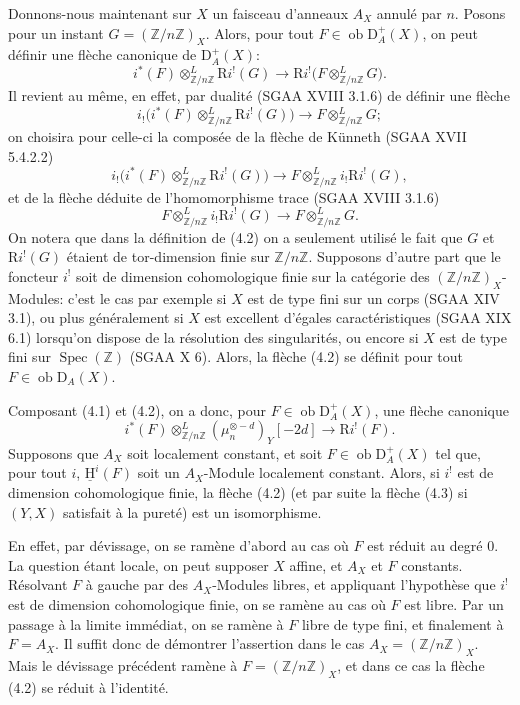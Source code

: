 \documentclass[11pt]{article}
\providecommand{\uH}{\underline{\mathrm H}}
\DeclareMathOperator{\Spec}{Spec}
\newcommand{\R}{\mathrm{R}}\newcommand{\RHomCore}{\mathrm{RHom}}
\newcommand{\D}{\mathrm{D}}
\newcommand{\Z}{\mathbb{Z}}
\newcommand{\ob}{\operatorname{ob}}
\providecommand{\ob}{\operatorname{ob}}
\providecommand{\R}{\mathrm R}
\providecommand{\Z}{\mathbb Z}
\providecommand{\Spec}{\operatorname{Spec}}
\providecommand{\Spec}{\operatorname{Spec}}
\providecommand{\Spec}{\operatorname{Spec}}
\providecommand{\Spec}{\operatorname{Spec}}
\begin{document}
Donnons-nous maintenant sur $X$ un faisceau d'anneaux $A_X$ annulé par $n$. Posons pour un instant $G=(\Z/n\Z)_X$. Alors, pour tout $F\in\ob\D_A^+(X)$, on peut définir une flèche canonique de $\D_A^+(X)$:
\begin{equation}\tag{4.2}
        i^*(F)\otimes^L_{\Z/n\Z} \R i^!(G)\longrightarrow \R i^!\bigl(F\otimes^L_{\Z/n\Z}G\bigr).
\end{equation}
Il revient au même, en effet, par dualité (SGAA XVIII 3.1.6) de définir une flèche
\[
        i_!\bigl(i^*(F)\otimes^L_{\Z/n\Z}\R i^!(G)\bigr)\longrightarrow F\otimes^L_{\Z/n\Z}G;
\]
on choisira pour celle-ci la composée de la flèche de Künneth (SGAA XVII 5.4.2.2)
\[
        i_!\bigl(i^*(F)\otimes^L_{\Z/n\Z}\R i^!(G)\bigr)\longrightarrow F\otimes^L_{\Z/n\Z}i_!\R i^!(G),
\]
et de la flèche déduite de l'homomorphisme trace (SGAA XVIII 3.1.6)
\[
        F\otimes^L_{\Z/n\Z}i_!\R i^!(G)\longrightarrow F\otimes^L_{\Z/n\Z}G.
\]
On notera que dans la définition de (4.2) on a seulement utilisé le fait que $G$ et $\R i^!(G)$ étaient de tor-dimension finie sur $\Z/n\Z$. Supposons d'autre part que le foncteur $i^!$ soit de dimension cohomologique finie sur la catégorie des $(\Z/n\Z)_X$-Modules: c'est le cas par exemple si $X$ est de type fini sur un corps (SGAA XIV 3.1), ou plus généralement si $X$ est excellent d'égales caractéristiques (SGAA XIX 6.1) lorsqu'on dispose de la résolution des singularités, ou encore si $X$ est de type fini sur $\Spec(\Z)$ (SGAA X 6). Alors, la flèche (4.2) se définit pour tout $F\in\ob\D_A(X)$.

Composant (4.1) et (4.2), on a donc, pour $F\in\ob\D_A^+(X)$, une flèche canonique
\begin{equation}\tag{4.3}
        i^*(F)\otimes^L_{\Z/n\Z}(\mu_n^{\otimes -d})_Y[-2d]\longrightarrow \R i^!(F).
\end{equation}
Supposons que $A_X$ soit localement constant, et soit $F\in\ob\D_A^+(X)$ tel que, pour tout $i$, $\uH^i(F)$ soit un $A_X$-Module localement constant. Alors, si $i^!$ est de dimension cohomologique finie, la flèche (4.2) (et par suite la flèche (4.3) si $(Y,X)$ satisfait à la pureté) est un isomorphisme.

En effet, par dévissage, on se ramène d'abord au cas où $F$ est réduit au degré $0$. La question étant locale, on peut supposer $X$ affine, et $A_X$ et $F$ constants. Résolvant $F$ à gauche par des $A_X$-Modules libres, et appliquant l'hypothèse que $i^!$ est de dimension cohomologique finie, on se ramène au cas où $F$ est libre. Par un passage à la limite immédiat, on se ramène à $F$ libre de type fini, et finalement à $F=A_X$. Il suffit donc de démontrer l'assertion dans le cas $A_X=(\Z/n\Z)_X$. Mais le dévissage précédent ramène à $F=(\Z/n\Z)_X$, et dans ce cas la flèche (4.2) se réduit à l'identité.
\end{document}
